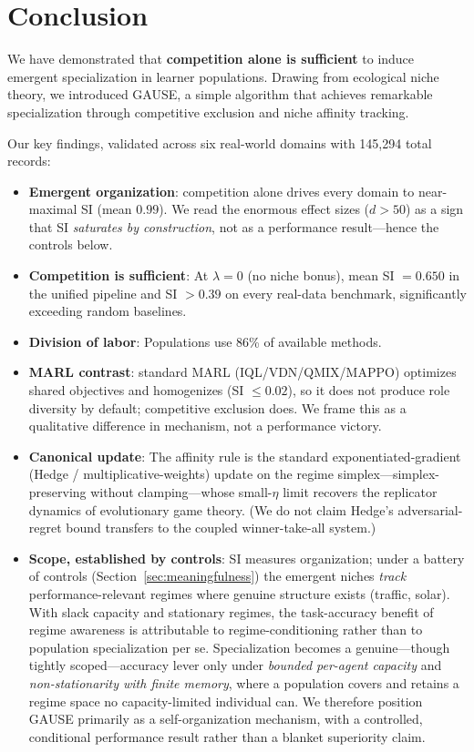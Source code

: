 \documentclass{article}
\begin{document}
\section{Conclusion}

We have demonstrated that \textbf{competition alone is sufficient} to induce emergent specialization in learner populations. Drawing from ecological niche theory, we introduced GAUSE, a simple algorithm that achieves remarkable specialization through competitive exclusion and niche affinity tracking.

Our key findings, validated across six real-world domains with 145,294 total records:

\begin{itemize}
    \item \textbf{Emergent organization}: competition alone drives every domain to near-maximal SI (mean $0.99$). We read the enormous effect sizes ($d > 50$) as a sign that SI \emph{saturates by construction}, not as a performance result---hence the controls below.
    \item \textbf{Competition is sufficient}: At $\lambda = 0$ (no niche bonus), mean SI $= 0.650$ in the unified pipeline and SI $> 0.39$ on every real-data benchmark, significantly exceeding random baselines.
    \item \textbf{Division of labor}: Populations use 86\% of available methods.
    \item \textbf{MARL contrast}: standard MARL (IQL/VDN/QMIX/MAPPO) optimizes shared objectives and homogenizes (SI $\le 0.02$), so it does not produce role diversity by default; competitive exclusion does. We frame this as a qualitative difference in mechanism, not a performance victory.
    \item \textbf{Canonical update}: The affinity rule is the standard exponentiated-gradient (Hedge / multiplicative-weights) update on the regime simplex---simplex-preserving without clamping---whose small-$\eta$ limit recovers the replicator dynamics of evolutionary game theory. (We do not claim Hedge's adversarial-regret bound transfers to the coupled winner-take-all system.)
    \item \textbf{Scope, established by controls}: SI measures organization; under a battery of controls (Section~\ref{sec:meaningfulness}) the emergent niches \emph{track} performance-relevant regimes where genuine structure exists (traffic, solar). With slack capacity and stationary regimes, the task-accuracy benefit of regime awareness is attributable to regime-conditioning rather than to population specialization per se. Specialization becomes a genuine---though tightly scoped---accuracy lever only under \emph{bounded per-agent capacity} and \emph{non-stationarity with finite memory}, where a population covers and retains a regime space no capacity-limited individual can. We therefore position GAUSE primarily as a self-organization mechanism, with a controlled, conditional performance result rather than a blanket superiority claim.
\end{itemize}
\end{document}
